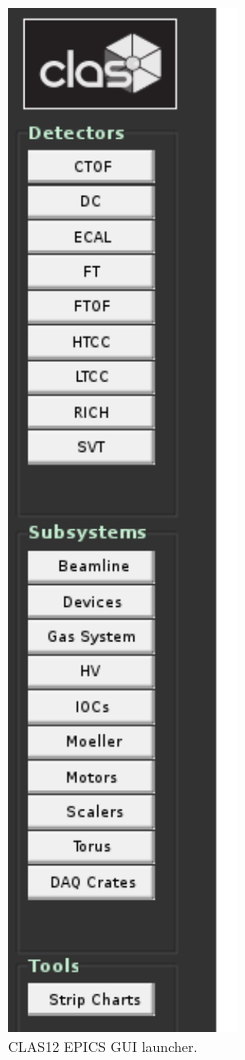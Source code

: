 \documentclass[12pt]{article}
\begin{document}
\begin{figure}[htp]
{\centering \includegraphics[scale=0.85]{CLAS_CSS.pdf}\par}
\caption{\small{CLAS12 EPICS GUI launcher.}}
\label{clascss}
\end{figure}
\end{document}
